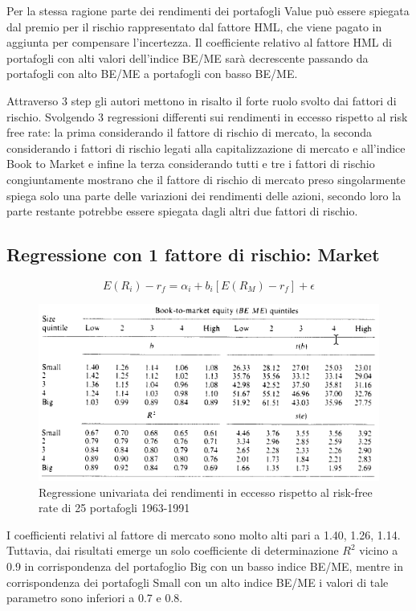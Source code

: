 Per la stessa ragione parte dei rendimenti dei portafogli Value può essere spiegata dal premio per il rischio rappresentato dal fattore HML, che viene pagato in aggiunta per compensare l'incertezza. Il coefficiente relativo al fattore HML di portafogli con alti valori dell'indice BE/ME sarà decrescente passando da portafogli con alto BE/ME a portafogli con basso BE/ME.

Attraverso 3 step gli autori mettono in risalto il forte ruolo svolto dai fattori di rischio. Svolgendo 3 regressioni differenti sui rendimenti in eccesso rispetto al risk free rate: la prima considerando il fattore di rischio di mercato, la seconda considerando i fattori di rischio legati alla capitalizzazione di mercato e all'indice Book to Market e infine la terza considerando tutti e tre i fattori di rischio congiuntamente mostrano che il fattore di rischio di mercato preso singolarmente spiega solo una parte delle variazioni dei rendimenti delle azioni, secondo loro la parte restante potrebbe essere spiegata dagli altri due fattori di rischio. 

\subsection{Regressione con 1 fattore di rischio: Market}
\begin{equation}
E(R_i)-r_f= \alpha_i + b_i[E(R_M)-r_f]+\epsilon
\end{equation}

\begin{figure} [h]
	\centering
\includegraphics[width=0.9\linewidth]{"imgs/Tabella risultati 1 fattore"}
\caption{Regressione univariata dei rendimenti in eccesso rispetto al risk-free rate di 25 portafogli 1963-1991}
\label{fig:tabella-risultati-1-fattore}
\end{figure}


I coefficienti relativi al fattore di mercato sono molto alti pari a 1.40, 1.26, 1.14. 
Tuttavia, dai risultati emerge un solo coefficiente di determinazione $R^2$ vicino a 0.9 in corrispondenza del portafoglio Big con un basso indice BE/ME, mentre in corrispondenza dei portafogli Small con un alto indice BE/ME i valori di tale parametro sono inferiori a 0.7 e 0.8. 

